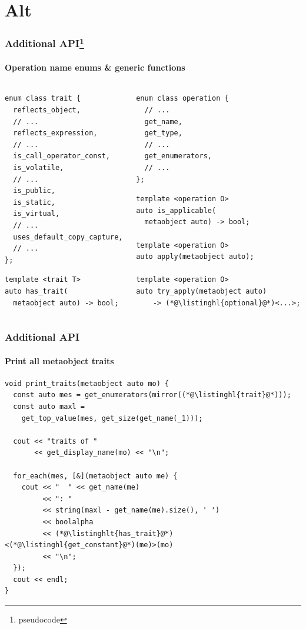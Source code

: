 \documentclass[aspectratio=169,compress,table,xcolor=table]{beamer}
\begin{document}
\section{Alt}
\begin{frame}[fragile]
  \frametitle{Additional API\footnote{pseudocode}}
  \framesubtitle{Operation name enums \& generic functions}
  \begin{columns}
    \begin{column}{.50\textwidth}
      \begin{lstlisting}[language=c++2x,basicstyle=\scriptsize\ttfamily]
enum class trait {
  reflects_object,
  // ...
  reflects_expression,
  // ...
  is_call_operator_const,
  is_volatile,
  // ...
  is_public,
  is_static,
  is_virtual,
  // ...
  uses_default_copy_capture,
  // ...
};
      \end{lstlisting}
      \vfill
      \begin{lstlisting}[language=c++2x,basicstyle=\scriptsize\ttfamily]
template <trait T>
auto has_trait(
  metaobject auto) -> bool;
      \end{lstlisting}
    \end{column}
    \begin{column}{.50\textwidth}
      \begin{lstlisting}[language=c++2x,basicstyle=\scriptsize\ttfamily]
enum class operation {
  // ...
  get_name,
  get_type,
  // ...
  get_enumerators,
  // ...
};
      \end{lstlisting}
      \begin{lstlisting}[language=c++2x,basicstyle=\scriptsize\ttfamily]
template <operation O>
auto is_applicable(
  metaobject auto) -> bool;

template <operation O>
auto apply(metaobject auto);

template <operation O>
auto try_apply(metaobject auto)
    -> (*@\listinghl{optional}@*)<...>;
      \end{lstlisting}
    \end{column}
  \end{columns}
\end{frame}
\begin{frame}[fragile]
  \frametitle{Additional API}
  \framesubtitle{Print all metaobject traits}
  \begin{lstlisting}[language=c++2x,basicstyle=\footnotesize\ttfamily]
void print_traits(metaobject auto mo) {
  const auto mes = get_enumerators(mirror((*@\listinghl{trait}@*)));
  const auto maxl =
    get_top_value(mes, get_size(get_name(_1)));

  cout << "traits of "
       << get_display_name(mo) << "\n";

  for_each(mes, [&](metaobject auto me) {
    cout << "  " << get_name(me)
         << ": "
         << string(maxl - get_name(me).size(), ' ')
         << boolalpha
         << (*@\listinghlt{has_trait}@*)<(*@\listinghl{get_constant}@*)(me)>(mo)
         << "\n";
  });
  cout << endl;
}
  \end{lstlisting}
\end{frame}
\end{document}

